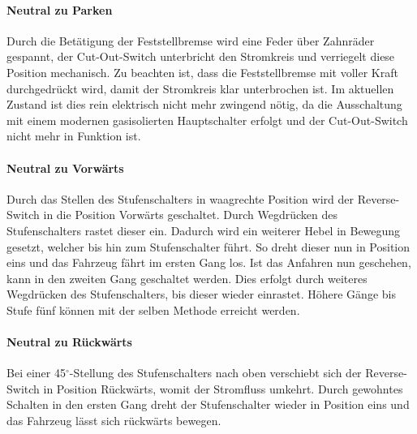 \paragraph{Neutral zu Parken}
Durch die Betätigung der Feststellbremse wird eine Feder über Zahnräder gespannt, der Cut-Out-Switch unterbricht den Stromkreis und verriegelt diese Position mechanisch. Zu beachten ist, dass die Feststellbremse mit voller Kraft durchgedrückt wird, damit der Stromkreis klar unterbrochen ist. Im aktuellen Zustand ist dies rein elektrisch nicht mehr zwingend nötig, da die Ausschaltung mit einem modernen gasisolierten Hauptschalter erfolgt und der Cut-Out-Switch nicht mehr in Funktion ist.

\paragraph{Neutral zu Vorwärts}
Durch das Stellen des Stufenschalters in waagrechte Position wird der Reverse-Switch in die Position Vorwärts geschaltet. Durch Wegdrücken des Stufenschalters rastet dieser ein. Dadurch wird ein weiterer Hebel in Bewegung gesetzt, welcher bis hin zum Stufenschalter führt. So dreht dieser nun in Position eins und das Fahrzeug fährt im ersten Gang los. Ist das Anfahren nun geschehen, kann in den zweiten Gang geschaltet werden. Dies erfolgt durch weiteres Wegdrücken des Stufenschalters, bis dieser wieder einrastet. Höhere Gänge bis Stufe fünf können mit der selben Methode erreicht werden.

\paragraph{Neutral zu Rückwärts}
Bei einer 45$^\circ$-Stellung des Stufenschalters nach oben verschiebt sich der Reverse-Switch in Position Rückwärts, womit der Stromfluss umkehrt. Durch gewohntes Schalten in den ersten Gang dreht der Stufenschalter wieder in Position eins und das Fahrzeug lässt sich rückwärts bewegen.